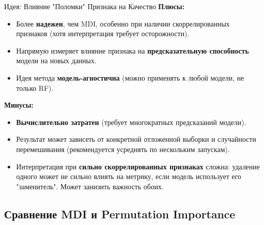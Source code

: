 \begin{myexampleblock}{Идея: Влияние "Поломки" Признака на Качество}
    \textbf{Плюсы:}
    \begin{itemize}
        \item Более \textbf{надежен}, чем MDI, особенно при наличии скоррелированных признаков (хотя интерпретация требует осторожности).
        \item Напрямую измеряет влияние признака на \textbf{предсказательную способность} модели на новых данных.
        \item Идея метода \textbf{модель-агностична} (можно применять к любой модели, не только RF).
    \end{itemize}
    \textbf{Минусы:}
    \begin{itemize}
        \item \textbf{Вычислительно затратен} (требует многократных предсказаний модели).
        \item Результат может зависеть от конкретной отложенной выборки и случайности перемешивания (рекомендуется усреднять по нескольким запускам).
        \item Интерпретация при \textbf{сильно скоррелированных признаках} сложна: удаление одного может не сильно влиять на метрику, если модель использует его "заменитель". Может занизить важность обоих.
    \end{itemize}
\end{myexampleblock}

\subsection{Сравнение MDI и Permutation Importance}


